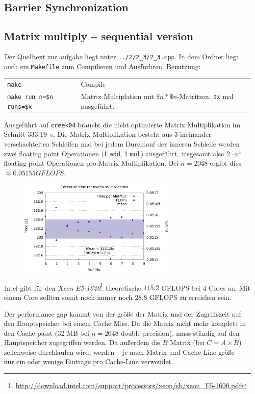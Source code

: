 \documentclass[a4paper,11pt]{scrartcl}
\begin{document}
\subsection{Barrier Synchronization}


\subsection{Matrix multiply – sequential version}

Der Quelltext zur aufgabe liegt unter \verb+../2/2_3/2_3.cpp+. In dem Ordner liegt auch ein \verb+Makefile+ zum Compilieren und Ausfürhren. Benutzung: 

\begin{table}[h!]
    \begin{tabular}{ll}
    \verb+make+& Compile \\ 
    \verb+make run n=$n runs=$x+ & Matrix Multiplation mit $\$n*\$n$-Matritzen, \verb+$x+ mal ausgeführt.\\
    \end{tabular}
\end{table}

Ausgeführt auf \verb+creek04+ braucht die nicht optimierte Matrix Multiplikation im Schnitt \SI{333.19}{\second}. Die Matrix Multiplikation besteht aus 3 ineinander verschachtelten Schleifen und bei jedem Durchlauf der inneren Schleife werden zwei floating point Operationen (1 \verb+add+, 1 \verb+mul+) ausgeführt, insgesamt also $2\cdot n^3$ floating point Operationen pro Matrix Multiplikation. Bei $n=2048$ ergibt dies $\approx 0.05155 GFLOPS$. 

\begin{figure}[h!]
    \centering
    \includegraphics[width=0.7\textwidth,keepaspectratio]{2_3/data/matmult.eps}
\end{figure}

Intel gibt für den \emph{Xeon E5-1620}\footnote{\url{http://download.intel.com/support/processors/xeon/sb/xeon_E5-1600.pdf}} theoretische $115.2$ GFLOPS bei 4 Cores an. Mit einem Core sollten somit noch immer noch $28.8$ GFLOPS zu erreichen sein.

Der performance gap kommt von der größe der Matrix und der Zugriffszeit auf den Hauptspeicher bei einem Cache Miss. Da die Matrix nicht mehr komplett in den Cache passt (32 MB bei $n=2048$ double-precision), muss ständig auf den Hauptspeicher zugegriffen werden. Da außerdem die $B$ Matrix (bei $C=A\times B$) zeilenweise durchlaufen wird, werden -- je nach Matrix und Cache-Line größe -- nur ein oder wenige Einträge pro Cache-Line verwendet. 
\end{document}
